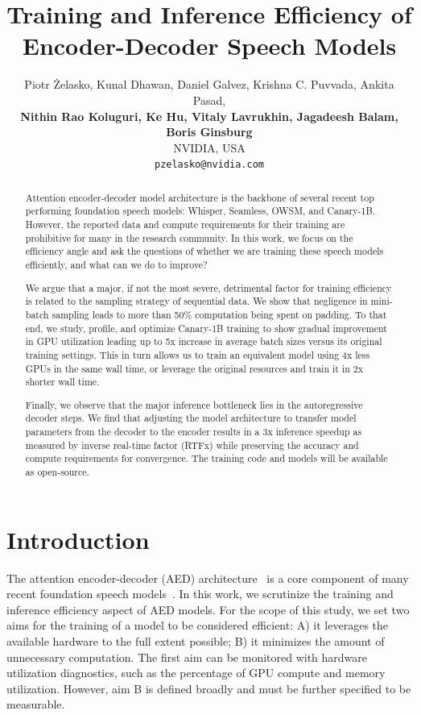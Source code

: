 \documentclass[11pt]{article}
\title{Training and Inference Efficiency of Encoder-Decoder Speech Models}
\author{
    Piotr Żelasko,  Kunal Dhawan, Daniel Galvez, Krishna C. Puvvada, Ankita Pasad, \\
    {\bf Nithin Rao Koluguri, Ke Hu, Vitaly Lavrukhin, Jagadeesh Balam, Boris Ginsburg} \\
        NVIDIA, USA \\
        \texttt{pzelasko@nvidia.com}
        }
\begin{document}
\maketitle
\begin{abstract}
Attention encoder-decoder model architecture is the backbone of several recent top performing foundation speech models: Whisper, Seamless, OWSM, and Canary-1B. 
However, the reported data and compute requirements for their training are prohibitive for many in the research community.
In this work, we focus on the efficiency angle and ask the questions of whether we are training these speech models efficiently, and what can we do to improve?

We argue that a major, if not the most severe, detrimental factor for training efficiency is related to the sampling strategy of sequential data.
We show that negligence in mini-batch sampling leads to more than 50\% computation being spent on padding.
To that end, we study, profile, and optimize Canary-1B training to show gradual improvement in GPU utilization leading up to 5x increase in average batch sizes versus its original training settings. 
This in turn allows us to train an equivalent model using 4x less GPUs in the same wall time, or leverage the original resources and train it in 2x shorter wall time. 

Finally, we observe that the major inference bottleneck lies in the autoregressive decoder steps. 
We find that adjusting the model architecture to transfer model parameters from the decoder to the encoder results in a 3x inference speedup as measured by inverse real-time factor (RTFx) while preserving the accuracy and compute requirements for convergence.
The training code and models will be available as open-source.
\end{abstract}


\section{Introduction}
\label{sec:introduction}

The attention encoder-decoder (AED) architecture~\cite{chan2016listen} is a core component of many recent foundation speech models~\cite{radford2022robustspeechrecognitionlargescale,barrault2023seamless,peng2023reproducing,peng2024owsm,puvvada24_interspeech}. 
In this work, we scrutinize the training and inference efficiency aspect of AED models. 
For the scope of this study, we set two aims for the training of a model to be considered efficient: A) it leverages the available hardware to the full extent possible; B) it minimizes the amount of unnecessary computation. 
The first aim can be monitored with hardware utilization diagnostics, such as the percentage of GPU compute and memory utilization. 
However, aim B is defined broadly and must be further specified to be measurable. 
\end{document}
